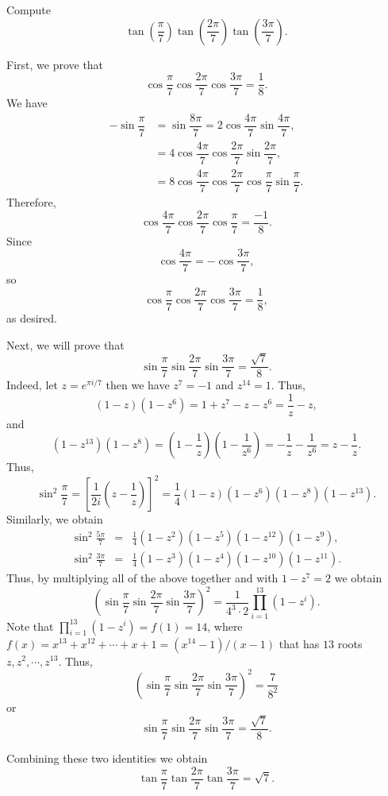 %	








\begin{question}[name={2016 HMMT, Guts, \href{https://artofproblemsolving.com/community/c129h1359338p7444611}{Problem 15}}]
	Compute $$\tan\left(\frac{\pi}{7}\right)\tan\left(\frac{2\pi}{7}\right)\tan\left(\frac{3\pi}{7}\right).$$
\end{question}





\begin{solution}[name={Solution by shinichiman}]
	First, we prove that $$\cos \dfrac{\pi}{7} \cos \dfrac{2\pi}{7} \cos \dfrac{3\pi}{7}= \frac{1}{8}.$$ We have
	\begin{align*} -\sin \dfrac{\pi}{7} & = \sin \dfrac{8\pi}{7}= 2\cos \dfrac{4\pi}{7} \sin \dfrac{4\pi}{7}, \\
		& = 4 \cos \dfrac{4\pi}{7} \cos \dfrac{2\pi}{7} \sin \dfrac{2\pi}{7}, \\
		& = 8 \cos \dfrac{4\pi}{7} \cos \dfrac{2\pi}{7} \cos \dfrac{\pi}{7} \sin \dfrac{\pi}{7}. \end{align*}
	Therefore, $$\cos \dfrac{4\pi}{7} \cos \dfrac{2\pi}{7} \cos \dfrac{\pi}{7}= \dfrac{-1}{8}.$$ Since $$\cos \frac{4\pi}{7}= - \cos \dfrac{3\pi}{7},$$ so $$\cos \dfrac{\pi}{7} \cos \dfrac{2\pi}{7} \cos \dfrac{3\pi}{7}= \frac{1}{8},$$ as desired.
	
	
	Next, we will prove that $$\sin \frac{\pi}{7} \sin \frac{2\pi}{7} \sin \frac{3\pi}{7}= \frac{\sqrt{7}}{8}.$$ Indeed, let $z= e^{\pi i/7}$ then we have $z^7=-1$ and $z^{14}=1$. Thus, $$(1-z)(1-z^6)=1+z^7-z-z^6= \frac{1}{z}-z,$$ and $$(1-z^{13})(1-z^8)=\left(1- \frac 1z \right) \left(1- \frac{1}{z^6} \right)=-\frac{1}{z}- \frac{1}{z^6}=z- \frac{1}{z}.$$ Thus, $$\sin^2 \frac{\pi}{7}= \left[ \frac{1}{2i} \left(z- \frac{1}{z} \right) \right]^2=\frac 14(1-z)(1-z^6)(1-z^8)(1-z^{13}).$$Similarly, we obtain
	\begin{eqnarray*} \sin^2 \frac{5\pi}{7} & = & \frac 14 (1-z^2)(1-z^5)(1-z^{12})(1-z^{9}), \\
		\sin^2 \frac{3\pi}{7} & =& \frac 14 (1-z^3)(1-z^4)(1-z^{10})(1-z^{11}).
	\end{eqnarray*}
	Thus, by multiplying all of the above together and with $1-z^7=2$ we obtain
	$$\left( \sin \frac{\pi}{7} \sin \frac{2\pi}{7} \sin \frac{3\pi}{7} \right)^2= \frac{1}{4^3 \cdot 2} \prod_{i=1}^{13} (1-z^i).$$
	Note that $\prod_{i=1}^{13} (1-z^i)= f(1)=14$, where $f(x)=x^{13}+x^{12}+ \cdots + x+1= ({x^{14}-1})/({x-1})$ that has $13$ roots $z,z^2, \cdots , z^{13}$. Thus, $$\left( \sin \frac{\pi}{7} \sin \frac{2\pi}{7} \sin \frac{3\pi}{7} \right)^2= \frac{7}{8^2}$$ or $$ \sin \frac{\pi}{7} \sin \frac{2\pi}{7} \sin \frac{3\pi}{7} =\frac{\sqrt{7}}{8}.$$
	
	Combining these two identities we obtain $$\tan \frac{\pi}{7}\tan \frac{2\pi}{7}\tan \frac{3\pi}{7}= \sqrt{7}.$$
\end{solution}


